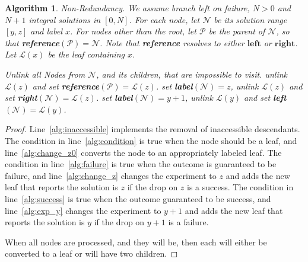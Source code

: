 \documentclass[12pt]{amsart}
\newtheorem{algorithm}[theorem]{Algorithm}
\theoremstyle{definition}
\theoremstyle{theorem}
\begin{document}
\begin{algorithm} \textit{Non-Redundancy}. We assume branch left on failure, $N>0$ and $N+1$ integral solutions in $[0,N]$. For each node, let $\mathcal{N}$ be its solution range $[y,z]$ and label $x$. For nodes other than the root, let $\mathcal{P}$ be the parent of $\mathcal{N}$, so that \textbf{reference}$(\mathcal{P})=\mathcal{N}$. Note that \textbf{reference} resolves to either $\textbf{left}$ or $\textbf{right}$. Let $\mathcal{L}(x)$ be the leaf containing $x$.

\begin{algorithmic}[1]
\State Unlink all Nodes from $\mathcal{N}$, and its children, that are impossible to visit. \label{alg:inaccessible}
 \label{alg:condition}
	\State unlink $\mathcal{L}(z)$ and set \textbf{reference}$(\mathcal{P})=\mathcal{L}(z)$.\label{alg:change_z0}
 \label{alg:failure}
	\State set \textbf{label}$(\mathcal{N})=z$, unlink $\mathcal{L}(z)$ and set \textbf{right}$(\mathcal{N})=\mathcal{L}(z)$.  \label{alg:change_z}
\label{alg:success}
	\State set \textbf{label}$(\mathcal{N})=y+1$, unlink $\mathcal{L}(y)$ and set \textbf{left}$(\mathcal{N})=\mathcal{L}(y)$. \label{alg:exp_y}
\EndIf
\EndIf
\EndFor
\end{algorithmic}
\end{algorithm}

\begin{proof} 
Line~\ref{alg:inaccessible} implements the removal of inaccessible descendants.  The condition in line~\ref{alg:condition}
is true when the node should be a leaf, and line~\ref{alg:change_z0} converts the node to an appropriately labeled leaf.
The condition in line~\ref{alg:failure} is true when the outcome is guaranteed to be failure, and line~\ref{alg:change_z} changes the 
experiment to $z$ and adds the new leaf that reports the solution is $z$ if the drop on $z$ is a success.
The condition in line~\ref{alg:success} is true when the outcome guaranteed to be success, and line~\ref{alg:exp_y} changes
the experiment to $y+1$ and adds the new leaf that reports the solution is $y$ if the drop
on $y+1$ is a failure. 

When all nodes are processed, and they will be, then each will  either be converted to a leaf 
or will have two children.
\end{proof}
\end{document}

